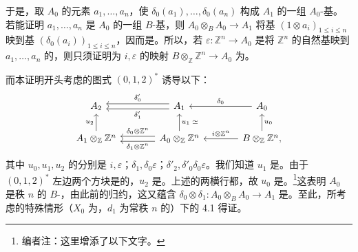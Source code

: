 于是，取 $A_0$ 的元素 $a_1,\ldots,a_n$，使 $\delta_0(a_1),\ldots,\delta_0(a_n)$ 构成 $A_1$ 的一组 $A_0$-基。若能证明 $a_1,\ldots,a_n$ 是 $A_0$ 的一组 $B$-基，则 $A_0\otimes_BA_0\to A_1$ 将基 $(1\otimes a_i)_{1\leqslant i\leqslant n}$ 映到基 $(\delta_0(a_i))_{1\leqslant i\leqslant n}$，因而是。所以，若 $\varepsilon:\mathbb Z^n\to A_0$ 是将 $\mathbb Z^n$ 的自然基映到 $a_1,\ldots,a_n$ 的，则只须证明为 $i,\varepsilon$ 的映射 $B\otimes_{\mathbb Z}\mathbb Z^n\to A_0$ 为。

而本证明开头考虑的图式 $(0,1,2)^*$ 诱导以下：
\[
\begin{tikzcd}[column sep=large]
A_2&A_1\arrow[l,shift left=.6ex,"\delta'_1"]\arrow[l,shift right=.6ex,"\delta'_0"']&A_0\arrow[l,"\delta_0"']\\
A_1\otimes_{\mathbb Z}\mathbb Z^n\arrow[u,"u_2"]&A_0\otimes_{\mathbb Z}\mathbb Z^n\arrow[u,"u_1\;\simeq"']\arrow[l,shift left=.6ex,"\delta_1\otimes\mathbb Z^n"]\arrow[l,shift right=.6ex,"\delta_0\otimes\mathbb Z^n"']&B\otimes_{\mathbb Z}\mathbb Z^n\arrow[u,"u_0"']\arrow[l,"i\otimes\mathbb Z^n"'] ,
\end{tikzcd}
\]
其中 $u_0,u_1,u_2$ 的分别是 $i,\varepsilon$；$\delta_1,\delta_0\varepsilon$；$\delta'_2,\delta'_0\delta_0\varepsilon$。我们知道 $u_1$ 是。由于 $(0,1,2)^*$ 左边两个方块是的，$u_2$ 是。上述的两横行都，故 $u_0$ 是。\footnote{编者注：这里增添了以下文字。}这表明 $A_0$ 是秩 $n$ 的 $B$-，由此前的归约，这又蕴含 $\delta_0\otimes\delta_1:A_0\otimes_BA_0\to A_1$ 是。至此，所考虑的特殊情形（$X_0$ 为，$d_1$ 为常秩 $n$ 的）下的 4.1 得证。

